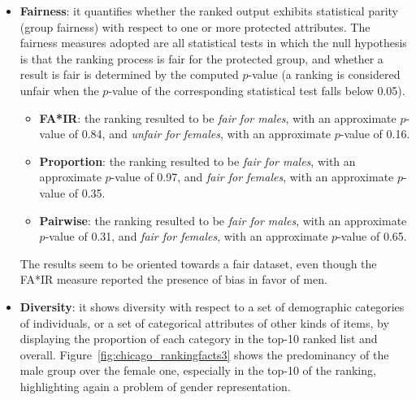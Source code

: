 \begin{itemize}
\item \textbf{Fairness}: it quantifies whether the ranked output exhibits statistical parity (group fairness) with respect to one or more protected attributes. The fairness measures adopted are all statistical tests in which the null hypothesis is that the ranking process is fair for the protected group, and whether a result is fair is determined by the computed \(p\)-value (a ranking is considered unfair when the \(p\)-value of the corresponding statistical test falls below 0.05).
\begin{itemize}
\item \textbf{FA*IR}: the ranking resulted to be \textit{fair for males}, with an approximate \(p\)-value of 0.84, and \textit{unfair for females}, with an approximate \(p\)-value of 0.16.
\item \textbf{Proportion}: the ranking resulted to be \textit{fair for males}, with an approximate \(p\)-value of 0.97, and \textit{fair for females}, with an approximate \(p\)-value of 0.35.
\item \textbf{Pairwise}: the ranking resulted to be \textit{fair for males}, with an approximate \(p\)-value of 0.31, and \textit{fair for females}, with an approximate \(p\)-value of 0.65.
\end{itemize}
The results seem to be oriented towards a fair dataset, even though the FA*IR measure reported the presence of bias in favor of men.
\item \textbf{Diversity}: it shows diversity with respect to a set of demographic categories of individuals, or a set of categorical attributes of other kinds of items, by displaying the proportion of each category in the top-10 ranked list and overall. Figure~\ref{fig:chicago_rankingfacts3} shows the predominancy of the male group over the female one, especially in the top-10 of the ranking, highlighting again a problem of gender representation.


\end{itemize}
